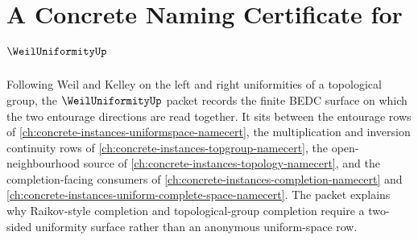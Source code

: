 \chapter{A Concrete Naming Certificate for $\WeilUniformityUp$}
\label{ch:concrete-instances-weil-uniformity-namecert}

Following Weil and Kelley on the left and right uniformities of a topological group, the $\WeilUniformityUp$ packet records the finite BEDC surface on which the two entourage directions are read together. It sits between the entourage rows of \autoref{ch:concrete-instances-uniformspace-namecert}, the multiplication and inversion continuity rows of \autoref{ch:concrete-instances-topgroup-namecert}, the open-neighbourhood source of \autoref{ch:concrete-instances-topology-namecert}, and the completion-facing consumers of \autoref{ch:concrete-instances-completion-namecert} and \autoref{ch:concrete-instances-uniform-complete-space-namecert}. The packet explains why Raikov-style completion and topological-group completion require a two-sided uniformity surface rather than an anonymous uniform-space row.

